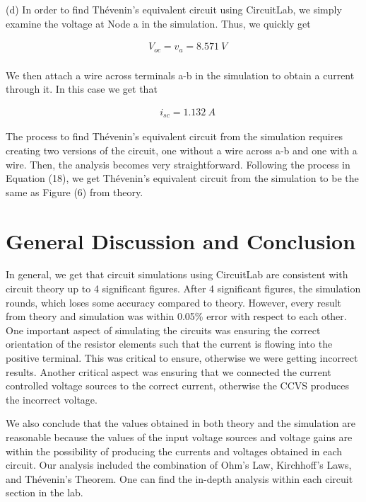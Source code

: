 \documentclass[12pt]{article}
\begin{document}
(d) In order to find Thévenin's equivalent circuit using CircuitLab, we simply examine the voltage at Node a in the simulation. Thus, we quickly get

\begin{equation}
    \begin{split}
        &V_{oc} = v_a = \SI{8.571}{V} \\
    \end{split}
\end{equation}

We then attach a wire across terminals a-b in the simulation to obtain a current through it. In this case we get that

\begin{equation}
    \begin{split}
        &i_{sc} = \SI{1.132}{A}
    \end{split}
\end{equation}

The process to find Thévenin's equivalent circuit from the simulation requires creating two versions of the circuit, one without a wire across a-b and one with a wire. Then, the analysis becomes very straightforward. Following the process in Equation (18), we get Thévenin's equivalent circuit from the simulation to be the same as Figure (6) from theory.

\pagebreak

\section{General Discussion and Conclusion}
In general, we get that circuit simulations using CircuitLab are consistent with circuit theory up to 4 significant figures. After 4 significant figures, the simulation rounds, which loses some accuracy compared to theory. However, every result from theory and simulation was within 0.05\% error with respect to each other. One important aspect of simulating the circuits was ensuring the correct orientation of the resistor elements such that the current is flowing into the positive terminal. This was critical to ensure, otherwise we were getting incorrect results. Another critical aspect was ensuring that we connected the current controlled voltage sources to the correct current, otherwise the CCVS produces the incorrect voltage.

We also conclude that the values obtained in both theory and the simulation are reasonable because the values of the input voltage sources and voltage gains are within the possibility of producing the currents and voltages obtained in each circuit. Our analysis included the combination of Ohm's Law, Kirchhoff's Laws, and Thévenin's Theorem. One can find the in-depth analysis within each circuit section in the lab.
\end{document}
